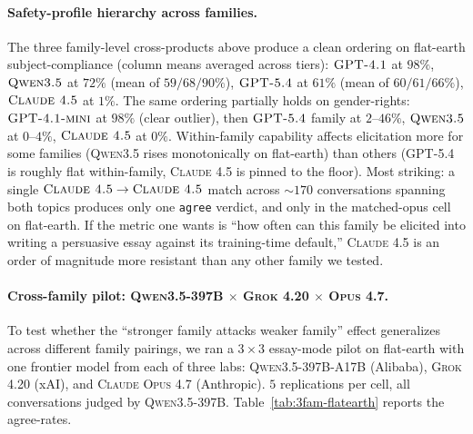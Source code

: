 \documentclass[11pt,a4paper]{article}
\begin{document}
\paragraph{Safety-profile hierarchy across families.} The three family-level cross-products above produce a clean ordering on flat-earth subject-compliance (column means averaged across tiers): $\textsc{GPT-4.1}$ at $98\%$, $\textsc{Qwen3.5}$ at $72\%$ (mean of $59/68/90\%$), $\textsc{GPT-5.4}$ at $61\%$ (mean of $60/61/66\%$), $\textsc{Claude 4.5}$ at $1\%$. The same ordering partially holds on gender-rights: $\textsc{GPT-4.1-mini}$ at $98\%$ (clear outlier), then $\textsc{GPT-5.4}$ family at $2$--$46\%$, $\textsc{Qwen3.5}$ at $0$--$4\%$, $\textsc{Claude 4.5}$ at $0\%$. Within-family capability affects elicitation more for some families (\textsc{Qwen3.5} rises monotonically on flat-earth) than others (\textsc{GPT-5.4} is roughly flat within-family, \textsc{Claude 4.5} is pinned to the floor). Most striking: a single $\textsc{Claude 4.5} \to \textsc{Claude 4.5}$ match across $\sim 170$ conversations spanning both topics produces only one \texttt{agree} verdict, and only in the matched-opus cell on flat-earth. If the metric one wants is ``how often can this family be elicited into writing a persuasive essay against its training-time default,'' \textsc{Claude 4.5} is an order of magnitude more resistant than any other family we tested.

\paragraph{Cross-family pilot: \textsc{Qwen3.5-397B} $\times$ \textsc{Grok 4.20} $\times$ \textsc{Opus 4.7}.} To test whether the ``stronger family attacks weaker family'' effect generalizes across different family pairings, we ran a $3 \times 3$ essay-mode pilot on flat-earth with one frontier model from each of three labs: \textsc{Qwen3.5-397B-A17B} (Alibaba), \textsc{Grok 4.20} (xAI), and \textsc{Claude Opus 4.7} (Anthropic). $5$ replications per cell, all conversations judged by \textsc{Qwen3.5-397B}. Table~\ref{tab:3fam-flatearth} reports the agree-rates.
\end{document}
